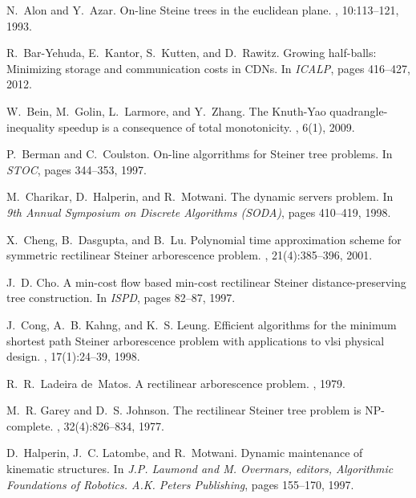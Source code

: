 \documentclass[11pt]{article}
\begin{document}
\def\thepage{}
{\small

\begin{thebibliography}{10}

N.~Alon and Y.~Azar.
\newblock On-line {S}teine trees in the euclidean plane.
, 10:113--121, 1993.

R.~Bar-Yehuda, E.~Kantor, S.~Kutten, and D.~Rawitz.
\newblock Growing half-balls: Minimizing storage and communication costs in
  {C}{D}{N}s.
\newblock In {\em ICALP}, pages 416--427, 2012.

W.~Bein, M.~Golin, L.~Larmore, and Y.~Zhang.
\newblock The {K}nuth-{Y}ao quadrangle-inequality speedup is a consequence of
  total monotonicity.
, 6(1), 2009.

P.~Berman and C.~Coulston.
\newblock On-line algorrithms for {S}teiner tree problems.
\newblock In {\em STOC}, pages 344--353, 1997.

M.~Charikar, D.~Halperin, and R.~Motwani.
\newblock The dynamic servers problem.
\newblock In {\em 9th Annual Symposium on Discrete Algorithms (SODA)}, pages
  410--419, 1998.

X.~Cheng, B.~Dasgupta, and B.~Lu.
\newblock Polynomial time approximation scheme for symmetric rectilinear
  {S}teiner arborescence problem.
, 21(4):385--396, 2001.

J.~D. Cho.
\newblock A min-cost flow based min-cost rectilinear {S}teiner
  distance-preserving tree construction.
\newblock In {\em ISPD}, pages 82--87, 1997.

J.~Cong, A.~B. Kahng, and K.~S. Leung.
\newblock Efficient algorithms for the minimum shortest path {S}teiner
  arborescence problem with applications to vlsi physical design.
,
  17(1):24--39, 1998.

R.~R.~Ladeira de~Matos.
\newblock A rectilinear arborescence problem.
, 1979.

M.~R. Garey and D.~S. Johnson.
\newblock The rectilinear {S}teiner tree problem is {N}{P}-complete.
, 32(4):826--834, 1977.

D.~Halperin, J.~C. Latombe, and R.~Motwani.
\newblock Dynamic maintenance of kinematic structures.
\newblock In {\em J.P. Laumond and M. Overmars, editors, Algorithmic
  Foundations of Robotics. A.K. Peters Publishing}, pages 155--170, 1997.


\end{thebibliography}}
\end{document}
